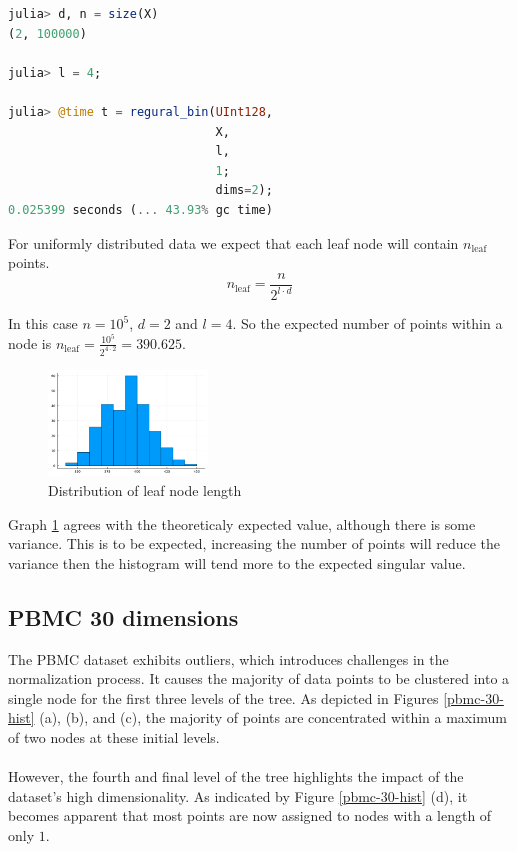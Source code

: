\documentclass{juliacon}
\begin{document}
\begin{lstlisting}[language = Julia]
julia> d, n = size(X)
(2, 100000)

julia> l = 4;

julia> @time t = regural_bin(UInt128,
                             X,
                             l,
                             1;
                             dims=2);
0.025399 seconds (... 43.93% gc time)
\end{lstlisting}

For uniformly distributed data we expect that each leaf node will contain
$n_{\textrm{leaf}}$ points.
$$n_{\textrm{leaf}} = \frac{n}{2^{l\cdot d}}$$

In this case $n = 10^5$, $d = 2$ and $l = 4$. So the expected number of points within a
node is $n_{\textrm{leaf}} = \frac{10^5}{2^{4\cdot 2}} =390.625$.

\begin{figure}[!ht]
  \centerline{
    \includegraphics[width=10pc]{figures/uniform_2d/hist.png}
  }
  \caption{ Distribution of leaf node length }
  \label{uniform-2d-hist}
\end{figure}

Graph \ref{uniform-2d-hist} agrees with the theoreticaly expected value, although there
is some variance. This is to be expected, increasing the number of points will reduce
the variance then the histogram will tend more to the expected singular value.

\subsection{PBMC 30 dimensions}

The PBMC dataset exhibits outliers, which introduces challenges in the
normalization process. It causes the majority of data points to be clustered
into a single node for the first three levels of the tree. As depicted in
Figures \ref{pbmc-30-hist} (a), (b), and (c), the majority of points are
concentrated within a maximum of two nodes at these initial levels.
\\\\
However, the fourth and final level of the tree highlights the impact of the
dataset's high dimensionality. As indicated by Figure \ref{pbmc-30-hist} (d),
it becomes apparent that most points are now assigned to nodes with a length of
only $1$.
\end{document}
